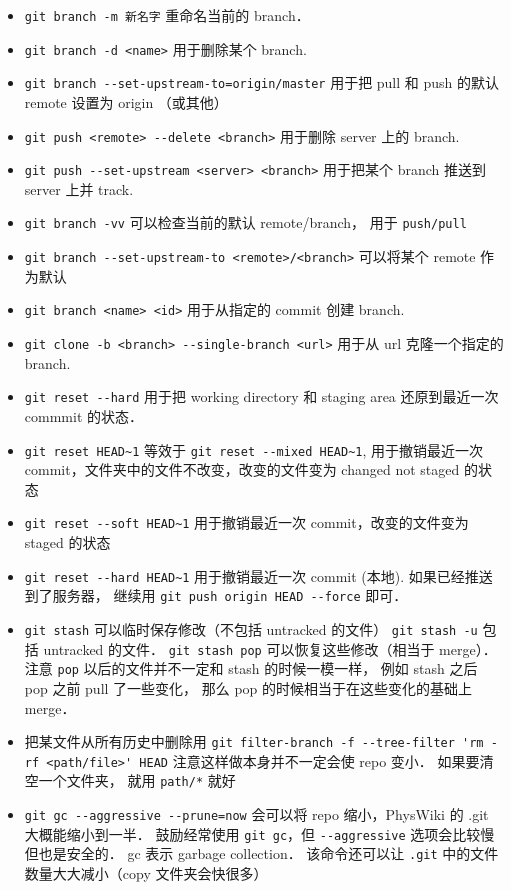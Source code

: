 \begin{itemize}
\item \verb|git branch -m 新名字| 重命名当前的 branch．
\item \verb|git branch -d <name>| 用于删除某个 branch.
\item \verb|git branch --set-upstream-to=origin/master| 用于把 pull 和 push 的默认 remote 设置为 origin （或其他）
\item \verb|git push <remote> --delete <branch>| 用于删除 server 上的 branch.
\item \verb|git push --set-upstream <server> <branch>| 用于把某个 branch 推送到 server 上并 track.
\item \verb|git branch -vv| 可以检查当前的默认 remote/branch， 用于 \verb|push/pull|
\item \verb|git branch --set-upstream-to <remote>/<branch>| 可以将某个 remote 作为默认
\item \verb|git branch <name> <id>| 用于从指定的 commit 创建 branch.
\item \verb|git clone -b <branch> --single-branch <url>| 用于从 url 克隆一个指定的 branch.
\item \verb|git reset --hard| 用于把 working directory 和 staging area 还原到最近一次 commmit 的状态．
\item \verb|git reset HEAD~1| 等效于 \verb|git reset --mixed HEAD~1|, 用于撤销最近一次 commit，文件夹中的文件不改变，改变的文件变为 changed not staged 的状态
\item \verb|git reset --soft HEAD~1| 用于撤销最近一次 commit，改变的文件变为 staged 的状态
\item \verb|git reset --hard HEAD~1| 用于撤销最近一次 commit (本地). 如果已经推送到了服务器， 继续用 \verb|git push origin HEAD --force| 即可．
\item \verb|git stash| 可以临时保存修改（不包括 untracked 的文件） \verb|git stash -u| 包括 untracked 的文件． \verb|git stash pop| 可以恢复这些修改（相当于 merge）． 注意 \verb|pop| 以后的文件并不一定和 stash 的时候一模一样， 例如 stash 之后 pop 之前 pull 了一些变化， 那么 pop 的时候相当于在这些变化的基础上 merge．
\item 把某文件从所有历史中删除用 \verb|git filter-branch -f --tree-filter 'rm -rf <path/file>' HEAD| 注意这样做本身并不一定会使 repo 变小． 如果要清空一个文件夹， 就用 \verb|path/*| 就好
\item \verb|git gc --aggressive --prune=now| 会可以将 repo 缩小，PhysWiki 的 .git 大概能缩小到一半． 鼓励经常使用 \verb|git gc|，但 \verb|--aggressive| 选项会比较慢但也是安全的． gc 表示 garbage collection． 该命令还可以让 \verb|.git| 中的文件数量大大减小（copy 文件夹会快很多）

\end{itemize}
